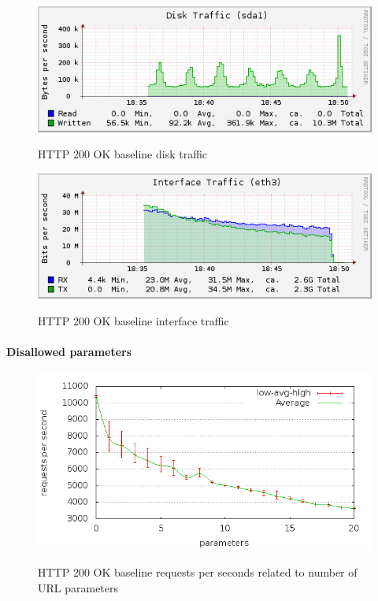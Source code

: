 \documentclass[Measurements]{subfiles}
\begin{document}
\begin{figure}[H]
\centering
\caption{HTTP 200 OK baseline disk traffic}
\includegraphics[scale=0.7]{images/results/200_with_naxsi_incremented_allowed_parameters/disk.png}
\label{fig:Baseline Nginx disk traffic}
\end{figure}

\begin{figure}[H]
\centering
\caption{HTTP 200 OK baseline interface traffic}
\includegraphics[scale=0.7]{images/results/200_with_naxsi_incremented_allowed_parameters/interface.png}
\label{fig:Baseline Nginx interface traffic}
\end{figure}

\paragraph{Disallowed parameters}

\begin{figure}[H]
\caption{HTTP 200 OK baseline requests per seconds related to number of URL parameters}
\centering
\includegraphics[scale=0.55] {images/results/200_with_naxsi_incremented_disallowed_parameters/output.png}
\label{fig:Baseline performance measurement}
\end{figure}
\end{document}
